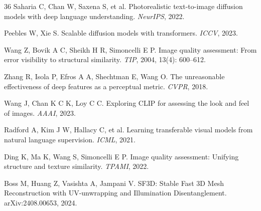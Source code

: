 \documentclass[times,twocolumn,final]{elsarticle}
\begin{document}
\begin{thebibliography}{36}
Saharia C, Chan W, Saxena S, et al. Photorealistic text-to-image diffusion models with deep language understanding. \textit{NeurIPS}, 2022.

Peebles W, Xie S. Scalable diffusion models with transformers. \textit{ICCV}, 2023.

Wang Z, Bovik A C, Sheikh H R, Simoncelli E P. Image quality assessment: From error visibility to structural similarity. \textit{TIP}, 2004, 13(4): 600--612.

Zhang R, Isola P, Efros A A, Shechtman E, Wang O. The unreasonable effectiveness of deep features as a perceptual metric. \textit{CVPR}, 2018.

Wang J, Chan K C K, Loy C C. Exploring CLIP for assessing the look and feel of images. \textit{AAAI}, 2023.

Radford A, Kim J W, Hallacy C, et al. Learning transferable visual models from natural language supervision. \textit{ICML}, 2021.

Ding K, Ma K, Wang S, Simoncelli E P. Image quality assessment: Unifying structure and texture similarity. \textit{TPAMI}, 2022.

Boss M, Huang Z, Vasishta A, Jampani V. SF3D: Stable Fast 3D Mesh Reconstruction with UV-unwrapping and Illumination Disentanglement. arXiv:2408.00653, 2024.

\end{thebibliography}
\end{document}
